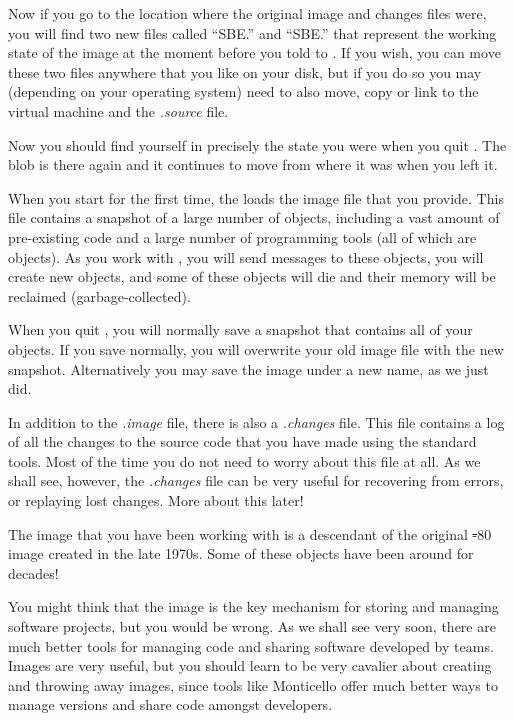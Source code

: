 \documentclass[a4paper,10pt,twoside]{book}
\begin{document}

Now if you go to the location where the original image and changes files were, you will find two new files called ``SBE.'' and ``SBE.'' that represent the working state of the \sq image at the moment before you told \sq to .
If you wish, you can move these two files anywhere that you like on your disk, but if you do so you may (depending on your operating system) need to also move, copy or link to the virtual machine and the \emph{.source} file.


Now you should find yourself in precisely the state you were when you quit \sq. The blob is there again and it continues to move from where it was when you left it.

When you start \sq for the first time, the \sq {} loads the image file that you provide. This file contains a snapshot of a large number of objects, including a vast amount of pre-existing code and a large number of programming tools (all of which are objects). As you work with \sq, you will send messages to these objects, you will create new objects, and some of these objects will die and their memory will be reclaimed (\ie garbage-collected).

When you quit \sq, you will normally save a snapshot that contains all of your objects.  If you save normally, you will overwrite your old image file with the new snapshot. Alternatively you may save the image under a new name, as we just did.

In addition to the \emph{.image} file, there is also a \emph{.changes} file.
This file contains a log of all the changes to the source code that you have made using the standard tools.
Most of the time you do not need to worry about this file at all.
As we shall see, however, the \emph{.changes} file can be very useful for recovering from errors, or replaying lost changes.
More about this later!

The image that you have been working with is a descendant of the original \st-80 image created in the late 1970s.
Some of these objects have been around for decades!

You might think that the image is the key mechanism for storing and managing software projects, but you would be wrong.
As we shall see very soon, there are much better tools for managing code and sharing software developed by teams.
Images are very useful, but you should learn to be very cavalier about creating and throwing away images, since tools like Monticello offer much better ways to manage versions and share code amongst developers.
\end{document}
